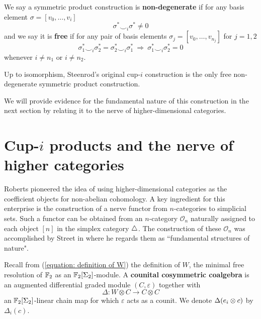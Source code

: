 We say a symmetric product construction is \textbf{non-degenerate} if for any basis element $\sigma = [v_0, \dots, v_i]$
\begin{equation*}
\boxed{\sigma^* \smallsmile_{i} \sigma^* \neq 0}
\end{equation*}
and we say it is \textbf{free} if for any pair of basis elements $\sigma_j = [v_0, \dots, v_{n_j}]$ for $j = 1, 2$
\begin{equation*}
\boxed{\sigma^*_1 \smallsmile_{i} \sigma^*_2 = \sigma^*_2 \smallsmile_{i} \sigma^*_1}\
\Longrightarrow\
\boxed{\sigma^*_1 \smallsmile_{i} \sigma^*_2 = 0}
\end{equation*}
whenever $i \neq n_1$ or $i \neq n_2$.

\begin{theorem} 
	Up to isomorphism, Steenrod's original cup-$i$ construction \cite{steenrod1947products} is the only free non-degenerate symmetric product construction.
\end{theorem}

We will provide evidence for the fundamental nature of this construction in the next section by relating it to the nerve of higher-dimensional categories.

\section{Cup-$i$ products and the nerve of higher categories}

Roberts \cite{roberts1977mathematical} pioneered the idea of using higher-dimensional categories as the coefficient objects for non-abelian cohomology. A key ingredient for this enterprise is the construction of a nerve functor from \mbox{$n$-categories} to simplicial sets. Such a functor can be obtained from an $n$-category $\mathcal{O}_n$ naturally assigned to each object $[n]$ in the simplex category $\triangle$. The construction of these $\mathcal O_n$ was accomplished by Street in \cite{street1987orientals} where he regards them as ``fundamental structures of nature".

Recall from (\ref{equation: definition of W}) the definition of $W$, the minimal free resolution of ${\mathbb{F}_2}$ as an ${\mathbb{F}_2}[\Sigma_2]$-module. A \textbf{counital cosymmetric coalgebra} is an augmented differential graded module $(C, \varepsilon)$ together with
\begin{equation*}
\Delta : W \otimes C \to C \otimes C
\end{equation*}
an ${\mathbb{F}_2}[\Sigma_2]$-linear chain map for which $\varepsilon$ acts as a counit. We denote $\Delta(e_i \otimes c)$ by $\Delta_i(c)$.

